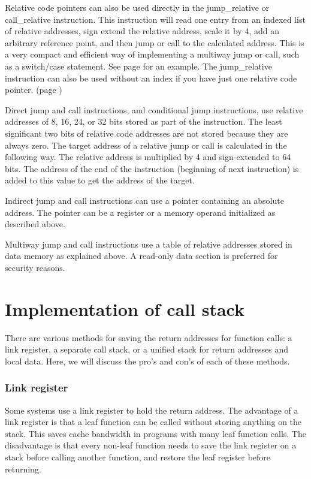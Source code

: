 \documentclass[forwardcom.tex]{subfiles}
\begin{document}
Relative code pointers can also be used directly in the jump\_relative or call\_relative instruction. 
This instruction will read one entry from an indexed list of relative addresses, sign extend the relative address, scale it by 4, add an arbitrary reference point, and then jump or call to the calculated address. This is a very compact and efficient way of implementing a multiway jump or call, such as a switch/case statement. 
See page \pageref{exampleSwitchCase} for an example. The jump\_relative  instruction can also be used without an index if you have just one relative code pointer. (page \pageref{exampleRelFuncPointer})
\vspace{4mm}

Direct jump and call instructions, and conditional jump instructions, use relative addresses of 8, 16, 24, or 32 bits stored as part of the instruction. The least significant two bits of relative code addresses are not stored because they are always zero. The target address of a relative jump or call is calculated in the following way. The relative address is multiplied by 4 and sign-extended to 64 bits. The address of the end of the instruction (beginning of next instruction) is added to this value to get the address of the target. \vv

Indirect jump and call instructions can use a pointer containing an absolute address. 
The pointer can be a register or a memory operand initialized as described above. 
\vv

Multiway jump and call instructions use a table of relative addresses stored in data memory as explained above. A read-only data section is preferred for security reasons. 
\vv


\section{Implementation of call stack} \label{callStackAlternatives}
There are various methods for saving the return addresses for function calls: a link register, a separate call stack, or a unified stack for return addresses and local data. Here, we will discuss the pro's and con's of each of these methods.
\vv

\subsubsection{Link register}
Some systems use a link register to hold the return address. The advantage of a link register is that a leaf function can be called without storing anything on the stack. This saves cache bandwidth in programs with many leaf function calls. The disadvantage is that every non-leaf function needs to save the link register on a stack before calling another function, and restore the leaf register before returning.
\vv
\end{document}
